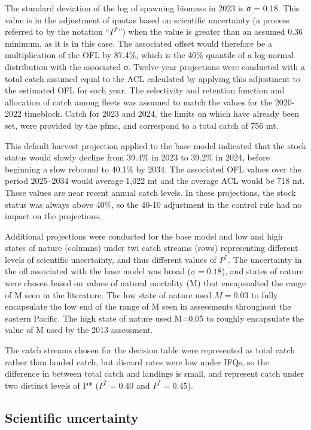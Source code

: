 \documentclass[11pt,
  english,
  letterpaper,
]{article}
\begin{document}
The standard deviation of the log of spawning biomass in 2023 is σ = 0.18. This value is in the adjustment of quotas based on scientific uncertainty (a process referred to by the notation ``\(P^*\)'') when the value is greater than an assumed 0.36 minimum, as it is in this case. The associated offset would therefore be a multiplication of the OFL by 87.4\%, which is the 40\% quantile of a log-normal distribution with the associated σ. Twelve-year projections were conducted with a total catch assumed equal to the ACL calculated by applying this adjustment to the estimated OFL for each year. The selectivity and retention function and allocation of catch among fleets was assumed to match the values for the 2020-2022 timeblock. Catch for 2023 and 2024, the limits on which have already been set, were provided by the \gls{pfmc}, and correspond to a total catch of 756 mt.

This default harvest projection applied to the base model indicated that the stock status would slowly decline from 39.4\% in 2023 to 39.2\% in 2024, before beginning a slow rebound to 40.1\% by 2034. The associated OFL values over the period 2025--2034 would average 1,022 mt and the average ACL would be 718 mt. These values are near recent annual catch levels. In these projections, the stock status was always above 40\%, so the 40-10 adjustment in the control rule had no impact on the projections.

Additional projections were conducted for the base model and low and high states of nature (columns) under twi catch streams (rows) representing different levels of scientific uncertainty, and thus different values of \(P^*\). The uncertainty in the \gls{ofl} associated with the base model was broad (\(\sigma = 0.18\)), and states of nature were chosen based on values of natural mortality (M) that encapsualted the range of M seen in the literature. The low state of nature used \(M=0.03\) to fully encapsulate the low end of the range of M seen in assessments throughout the eastern Pacific. The high state of nature used M=0.05 to roughly encapsulate the value of M used by the 2013 assessment.

The catch streams chosen for the decision table were represented as total catch rather than landed catch, but discard rates were low under IFQs, so the difference in between total catch and landings is small, and represent catch under two distinct levels of P* (\(P^*=0.40\) and \(P^*=0.45\)).

\hypertarget{scientific-uncertainty}{%
\subsection*{Scientific uncertainty}\label{scientific-uncertainty}}
\end{document}
